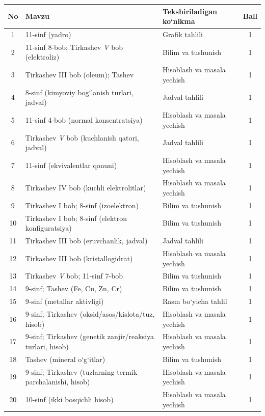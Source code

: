 \documentclass[11pt,a4paper]{article}
\begin{document}
{\small\noindent\begin{longtable}{|c|p{7.2cm}|p{5.4cm}|c|}\hline \textbf{No} & \textbf{Mavzu} & \textbf{Tekshiriladigan ko`nikma} & \textbf{Ball}\\\hline
1 & 11-sinf (yadro) & Grafik tahlili & 1\\\hline
2 & 11-sinf 8-bob; Tirkashev \textit{V} bob (elektroliz) & Bilim va tushunish & 1\\\hline
3 & Tirkashev III bob (oleum); Tashev & Hisoblash va masala yechish & 1\\\hline
4 & 8-sinf (kimyoviy bog`lanish turlari, jadval) & Jadval tahlili & 1\\\hline
5 & 11-sinf 4-bob (normal konsentratsiya) & Hisoblash va masala yechish & 1\\\hline
6 & Tirkashev \textit{V} bob (kuchlanish qatori, jadval) & Jadval tahlili & 1\\\hline
7 & 11-sinf (ekvivalentlar qonuni) & Hisoblash va masala yechish & 1\\\hline
8 & Tirkashev IV bob (kuchli elektrolitlar) & Hisoblash va masala yechish & 1\\\hline
9 & Tirkashev I bob; 8-sinf (izoelektron) & Bilim va tushunish & 1\\\hline
10 & Tirkashev I bob; 8-sinf (elektron konfiguratsiya) & Bilim va tushunish & 1\\\hline
11 & Tirkashev III bob (eruvchanlik, jadval) & Jadval tahlili & 1\\\hline
12 & Tirkashev III bob (kristallogidrat) & Hisoblash va masala yechish & 1\\\hline
13 & Tirkashev \textit{V} bob; 11-sinf 7-bob & Bilim va tushunish & 1\\\hline
14 & 9-sinf; Tashev (Fe, Cu, Zn, Cr) & Bilim va tushunish & 1\\\hline
15 & 9-sinf (metallar aktivligi) & Rasm bo`yicha tahlil & 1\\\hline
16 & 9-sinf; Tirkashev (oksid/asos/kislota/tuz, hisob) & Hisoblash va masala yechish & 1\\\hline
17 & 9-sinf; Tirkashev (genetik zanjir/reaksiya turlari, hisob) & Hisoblash va masala yechish & 1\\\hline
18 & Tashev (mineral o`g`itlar) & Bilim va tushunish & 1\\\hline
19 & 9-sinf; Tirkashev (tuzlarning termik parchalanishi, hisob) & Hisoblash va masala yechish & 1\\\hline
20 & 10-sinf (ikki bosqichli hisob) & Hisoblash va masala yechish & 1\\\hline

\end{longtable}}
\end{document}
